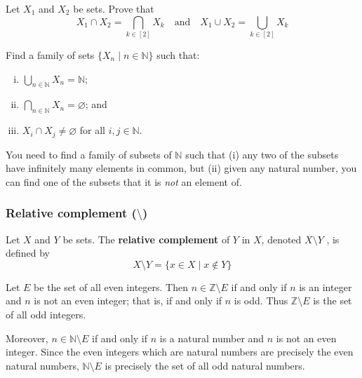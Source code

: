 \begin{exercise}
\label{exIndexedIntersectionUnionGeneralisePairwise}
Let $X_1$ and $X_2$ be sets. Prove that
\[ X_1 \cap X_2 = \bigcap_{k \in [2]} X_k \quad \text{and} \quad X_1 \cup X_2 = \bigcup_{k \in [2]} X_k \]
\end{exercise}

\begin{exercise}
\label{exSubsetsFiniteIntersectionInhabitedInfiniteIntersectionEmpty}
Find a family of sets $\{ X_n \mid n \in \mathbb{N} \}$ such that:
\begin{enumerate}[(i)]
\item $\displaystyle\bigcup_{n \in \mathbb{N}} X_n = \mathbb{N}$;
\item $\displaystyle\bigcap_{n \in \mathbb{N}} X_n = \varnothing$; and
\item $X_i \cap X_j \ne \varnothing$ for all $i,j \in \mathbb{N}$.
\end{enumerate}
\begin{backhint}
You need to find a family of subsets of $\mathbb{N}$ such that (i) any two of the subsets have infinitely many elements in common, but (ii) given any natural number, you can find one of the subsets that it is \textit{not} an element of.
\end{backhint}
\end{exercise}

\subsubsection*{Relative complement ($\setminus$)}

\begin{definition}
Let $X$ and $Y$ be sets. The \textbf{relative complement} of $Y$ in $X$, denoted $X \setminus Y$ , is defined by
\[ X \setminus Y = \{ x \in X \mid x \not \in Y \} \]
\end{definition}

\begin{example}
Let $E$ be the set of all even integers. Then $n \in \mathbb{Z} \setminus E$ if and only if $n$ is an integer and $n$ is not an even integer; that is, if and only if $n$ is odd. Thus $\mathbb{Z} \setminus E$ is the set of all odd integers.

Moreover, $n \in \mathbb{N} \setminus E$ if and only if $n$ is a natural number and $n$ is not an even integer. Since the even integers which are natural numbers are precisely the even natural numbers, $\mathbb{N} \setminus E$ is precisely the set of all odd natural numbers.
\end{example}


